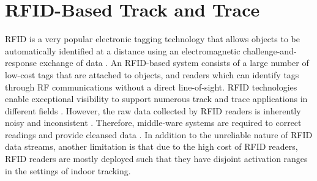 \documentclass[12pt]{report}
\begin{document}
\chapter{RFID-Based Track and Trace}
\label{sec:rfid-based-track-and-trace}
RFID is a very popular electronic tagging technology that allows
objects to be automatically identified at a distance using an
electromagnetic challenge-and-response exchange of data
\cite{want2004-magic}.  An RFID-based system consists of a large
number of low-cost tags that are attached to objects, and readers
which can identify tags through RF communications without a direct
line-of-sight.  RFID technologies enable exceptional visibility to
support numerous track and trace applications in different fields
\cite{yang2012-rfid}.  However, the raw data collected by RFID
readers is inherently noisy and inconsistent
\cite{sullivan2005-rfid,jeffery2006-adaptive}.  Therefore,
middle-ware systems are required to correct readings and provide
cleansed data \cite{jeffery2008-adaptive}.  In addition to the
unreliable nature of RFID data streams, another limitation is that
due to the high cost of RFID readers, RFID readers are mostly
deployed such that they have disjoint activation ranges in the
settings of indoor tracking.
\end{document}

